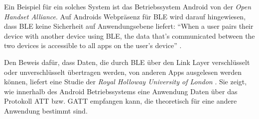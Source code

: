 Ein Beispiel für ein solches System ist das Betriebssystem Android von der \textit{Open Handset Alliance}. Auf Androids Webpräsenz für BLE wird darauf hingewiesen, dass BLE keine Sicherheit auf Anwendungsebene liefert: "`When a user pairs their device with another device using BLE, the data that's communicated between the two devices is accessible to all apps on the user's device"' \cite{AndroidAppLayerSec}.

Den Beweis dafür, dass Daten, die durch BLE über den Link Layer verschlüsselt oder unverschlüsselt übertragen werden, von anderen Apps ausgelesen werden können, liefert eine Studie der \textit{Royal Holloway University of London} \cite{RoyalHollowayUniversity}. Sie zeigt, wie innerhalb des Android Betriebssystems eine Anwendung Daten über das Protokoll ATT bzw. GATT empfangen kann, die theoretisch für eine andere Anwendung bestimmt sind.


